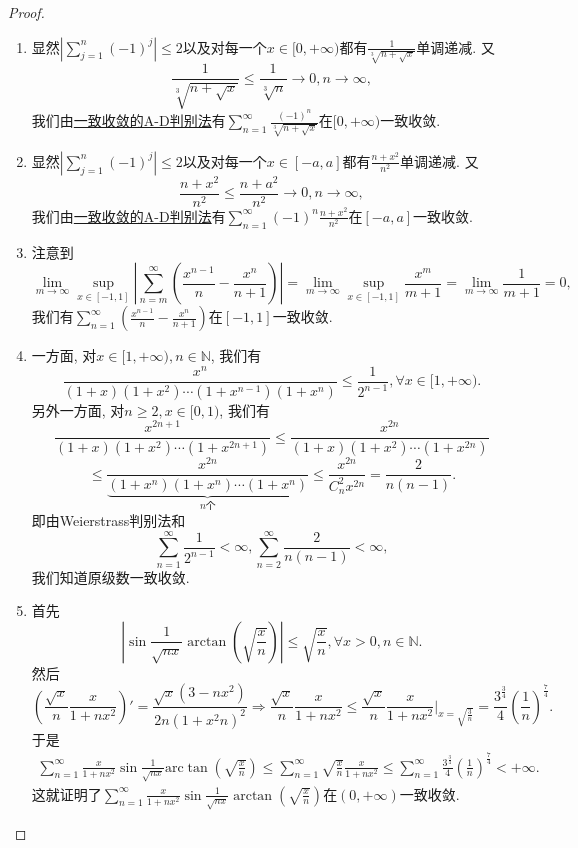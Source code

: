 \documentclass[../../main.tex]{subfiles}
\begin{document}
\begin{proof}
\begin{enumerate}
\item 显然\(\left| \sum_{j=1}^{n} (-1)^j \right| \leqslant 2\)以及对每一个\(x \in [0, +\infty)\)都有\(\frac{1}{\sqrt[3]{n + \sqrt{x}}}\)单调递减. 又
\[
\frac{1}{\sqrt[3]{n + \sqrt{x}}} \leqslant \frac{1}{\sqrt[3]{n}} \to 0, n \to \infty,
\]
我们由\hyperref[theorem:级数一致收敛的A-D判别法]{一致收敛的A-D判别法}有\(\sum_{n=1}^{\infty} \frac{(-1)^n}{\sqrt[3]{n + \sqrt{x}}}\)在\([0, +\infty)\)一致收敛.

\item 显然\(\left| \sum_{j=1}^{n} (-1)^j \right| \leqslant 2\)以及对每一个\(x \in [-a, a]\)都有\(\frac{n + x^2}{n^2}\)单调递减. 又
\[
\frac{n + x^2}{n^2} \leqslant \frac{n + a^2}{n^2} \to 0, n \to \infty,
\]
我们由\hyperref[theorem:级数一致收敛的A-D判别法]{一致收敛的A-D判别法}有\(\sum_{n=1}^{\infty} (-1)^n \frac{n + x^2}{n^2}\)在\([-a, a]\)一致收敛.

\item 注意到
\[
\lim_{m \to \infty} \sup_{x \in [-1, 1]} \left| \sum_{n=m}^{\infty} \left( \frac{x^{n - 1}}{n} - \frac{x^n}{n + 1} \right) \right| = \lim_{m \to \infty} \sup_{x \in [-1, 1]} \frac{x^m}{m + 1} = \lim_{m \to \infty} \frac{1}{m + 1} = 0,
\]
我们有\(\sum_{n=1}^{\infty} \left( \frac{x^{n - 1}}{n} - \frac{x^n}{n + 1} \right)\)在\([-1, 1]\)一致收敛.

\item 一方面, 对\(x \in [1, +\infty), n \in \mathbb{N}\), 我们有
\[
\frac{x^n}{(1 + x)(1 + x^2) \cdots (1 + x^{n - 1})(1 + x^n)} \leqslant \frac{1}{2^{n - 1}}, \forall x \in [1, +\infty).
\]
另外一方面, 对\(n \geqslant 2, x \in [0, 1)\), 我们有
\[
\frac{x^{2n + 1}}{(1 + x)(1 + x^2) \cdots (1 + x^{2n + 1})} \leqslant \frac{x^{2n}}{(1 + x)(1 + x^2) \cdots (1 + x^{2n})}
\]
\[
\leqslant \frac{x^{2n}}{\underbrace{(1 + x^n)(1 + x^n) \cdots (1 + x^n)}_{n 个}} \leqslant \frac{x^{2n}}{C_n^2 x^{2n}} = \frac{2}{n(n - 1)}.
\]
即由Weierstrass判别法和
\[
\sum_{n=1}^{\infty} \frac{1}{2^{n - 1}} < \infty, \sum_{n=2}^{\infty} \frac{2}{n(n - 1)} < \infty,
\]
我们知道原级数一致收敛.

\item 首先
\[
\left| \sin \frac{1}{\sqrt{nx}} \arctan \left( \sqrt{\frac{x}{n}} \right) \right| \leqslant \sqrt{\frac{x}{n}}, \forall x > 0, n \in \mathbb{N}.
\]
然后
\[
\left( \frac{\sqrt{x}}{n} \frac{x}{1 + nx^2} \right)' = \frac{\sqrt{x}(3 - nx^2)}{2n(1 + x^2 n)^2} \Rightarrow \frac{\sqrt{x}}{n} \frac{x}{1 + nx^2} \leqslant \frac{\sqrt{x}}{n} \frac{x}{1 + nx^2} \bigg|_{x = \sqrt{\frac{3}{n}}} = \frac{3^{\frac{3}{4}}}{4} \left( \frac{1}{n} \right)^{\frac{7}{4}}.
\]
于是
\begin{align*}
\sum_{n=1}^{\infty}{\frac{x}{1+nx^2}\sin \frac{1}{\sqrt{nx}}\mathrm{arc}\tan \left( \sqrt{\frac{x}{n}} \right)}\leqslant \sum_{n=1}^{\infty}{\sqrt{\frac{x}{n}}\frac{x}{1+nx^2}}\leqslant \sum_{n=1}^{\infty}{\frac{3^{\frac{3}{4}}}{4}\left( \frac{1}{n} \right) ^{\frac{7}{4}}}<+\infty.
\end{align*}
这就证明了\(\sum_{n=1}^{\infty} \frac{x}{1 + nx^2} \sin \frac{1}{\sqrt{nx}} \arctan \left( \sqrt{\frac{x}{n}} \right)\)在\((0, +\infty)\)一致收敛.


\end{enumerate}
\end{proof}
\end{document}
